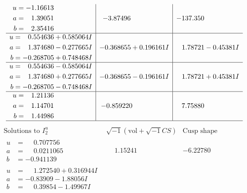 \documentclass[1p]{elsarticle_modified}
\theoremstyle{definition}
\newcommand{\I}{\sqrt{-1}}
\begin{document}
$$\begin{array}{c|c|c}
\begin{aligned}
u &= -1.16613\phantom{ +0.000000I} \\
a &= \phantom{-}1.39051\phantom{ +0.000000I} \\
b &= \phantom{-}2.35416\phantom{ +0.000000I}\end{aligned}
 & -3.87496\phantom{ +0.000000I} & -137.350\phantom{ +0.000000I} \\ \hline\begin{aligned}
u &= \phantom{-}0.554636 + 0.585064 I \\
a &= \phantom{-}1.374680 - 0.277665 I \\
b &= -0.268705 + 0.748468 I\end{aligned}
 & -0.368655 + 0.196161 I & \phantom{-}1.78721 - 0.45381 I \\ \hline\begin{aligned}
u &= \phantom{-}0.554636 - 0.585064 I \\
a &= \phantom{-}1.374680 + 0.277665 I \\
b &= -0.268705 - 0.748468 I\end{aligned}
 & -0.368655 - 0.196161 I & \phantom{-}1.78721 + 0.45381 I \\ \hline\begin{aligned}
u &= \phantom{-}1.21136\phantom{ +0.000000I} \\
a &= \phantom{-}1.14701\phantom{ +0.000000I} \\
b &= \phantom{-}1.44986\phantom{ +0.000000I}\end{aligned}
 & -0.859220\phantom{ +0.000000I} & \phantom{-}7.75880\phantom{ +0.000000I}\\
 \hline 
 \end{array}$$\newpage$$\begin{array}{c|c|c}  
\text{Solutions to }I^u_{2}& \I (\text{vol} + \sqrt{-1}CS) & \text{Cusp shape}\\
 \hline 
\begin{aligned}
u &= \phantom{-}0.707756\phantom{ +0.000000I} \\
a &= \phantom{-}0.0211065\phantom{ +0.000000I} \\
b &= -0.941139\phantom{ +0.000000I}\end{aligned}
 & \phantom{-}1.15241\phantom{ +0.000000I} & -6.22780\phantom{ +0.000000I} \\ \hline\begin{aligned}
u &= \phantom{-}1.272540 + 0.316944 I \\
a &= -0.83909 - 1.88056 I \\
b &= \phantom{-}0.39854 - 1.49967 I\end{aligned}

\end{array}$$
\end{document}
